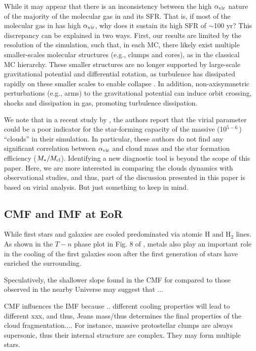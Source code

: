 \IfFileExists{emulateapjlegacy.cls}{\documentclass[iop]{emulateapjlegacy}}{\documentclass[iop]{emulateapj}}
\begin{document}
While it may appear that there is an inconsistency between the high $\alpha_{\rm vir}$
nature of the majority of the molecular gas in \flower and its SFR.
That is, if most of the molecular gas in \flower has high $\alpha_{\rm vir}$, why does it sustain its high SFR of $\sim$100\,\Msun\,yr\pmOne?
This discrepancy can be explained in two ways.
First, our results are limited by the resolution of the simulation, such that, in each MC, there
likely exist multiple smaller-scales molecular structures (e.g., clumps and cores),
as in the classical MC hierarchy. These smaller structures are 
no longer supported by large-scale gravitational potential and differential rotation,
as turbulence has dissipated rapidly on these smaller scales to enable collapse \citep{Clark04a}.
In addition, non-axisymmetric perturbations (e.g., arms) to the gravitational potential
can induce orbit crossing, shocks and dissipation in gas, promoting turbulence dissipation.

We note that in a recent study by \citet{Pettitt18a}, the authors report that the virial parameter could be a poor indicator
for the star-forming capacity of the massive (10$^{5-6}$\,\Msun) ``clouds'' in their simulation. 
In particular, these authors do not find any significant correlation between $\alpha_{\rm vir}$ and cloud mass
and the star formation efficiency ($M_*/M_{\rm cl}$).
Identifying a new diagnostic tool 
is beyond the scope of this paper. Here, we are more interested in 
comparing the clouds dynamics with observational studies, and thus, 
part of the discussion presented in this paper is based on virial analysis.
But just something to keep in mind.

\subsection{CMF and IMF at EoR}

While first stars and galaxies are cooled predominated via atomic H and H$_2$ lines.
As shown in the $T-n$ phase plot in Fig. 8 of \citealt{Pallottini17b}, 
metals also play an important role in the cooling of the first galaxies soon after the first generation of stars have enriched the surrounding.

Speculatively, the shallower slope found in the CMF for \flower compared to those observed in the nearby Universe may
suggest that ...

CMF influences the IMF because .. different cooling properties will lead to different xxx, and thus, Jeans mass/thus determines the final properties of the cloud fragmentation....  For instance, massive protostellar clumps are always supersonic, thus their internal structure are complex. They may form multiple stars.
\end{document}
